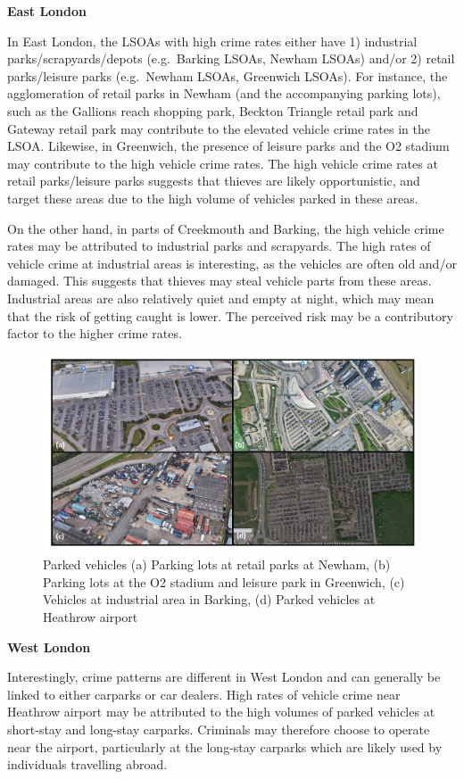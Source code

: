 \documentclass[]{article}
\theoremstyle{definition}
\theoremstyle{definition}
\theoremstyle{definition}
\theoremstyle{remark}
\begin{document}
\textbf{East London}

In East London, the LSOAs with high crime rates either have 1)
industrial parks/scrapyards/depots (e.g.~Barking LSOAs, Newham LSOAs)
and/or 2) retail parks/leisure parks (e.g.~Newham LSOAs, Greenwich
LSOAs). For instance, the agglomeration of retail parks in Newham (and
the accompanying parking lots), such as the Gallions reach shopping
park, Beckton Triangle retail park and Gateway retail park may
contribute to the elevated vehicle crime rates in the LSOA. Likewise, in
Greenwich, the presence of leisure parks and the O2 stadium may
contribute to the high vehicle crime rates. The high vehicle crime rates
at retail parks/leisure parks suggests that thieves are likely
opportunistic, and target these areas due to the high volume of vehicles
parked in these areas.

On the other hand, in parts of Creekmouth and Barking, the high vehicle
crime rates may be attributed to industrial parks and scrapyards. The
high rates of vehicle crime at industrial areas is interesting, as the
vehicles are often old and/or damaged. This suggests that thieves may
steal vehicle parts from these areas. Industrial areas are also
relatively quiet and empty at night, which may mean that the risk of
getting caught is lower. The perceived risk may be a contributory factor
to the higher crime rates.

\begin{figure}
\centering
\includegraphics{pictures/parkedcars.png}
\caption{Parked vehicles (a) Parking lots at retail parks at Newham, (b)
Parking lots at the O2 stadium and leisure park in Greenwich, (c)
Vehicles at industrial area in Barking, (d) Parked vehicles at Heathrow
airport}
\end{figure}

\textbf{West London}

Interestingly, crime patterns are different in West London and can
generally be linked to either carparks or car dealers. High rates of
vehicle crime near Heathrow airport may be attributed to the high
volumes of parked vehicles at short-stay and long-stay carparks.
Criminals may therefore choose to operate near the airport, particularly
at the long-stay carparks which are likely used by individuals
travelling abroad.
\end{document}
